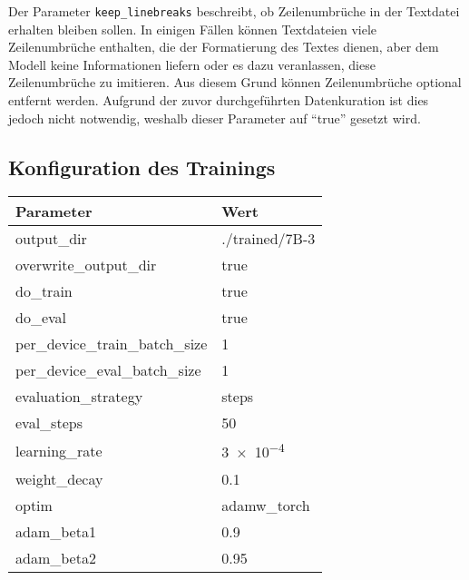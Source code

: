 Der Parameter \texttt{keep\_linebreaks} beschreibt, ob Zeilenumbrüche in der Textdatei erhalten bleiben sollen.
In einigen Fällen können Textdateien viele Zeilenumbrüche enthalten, die der Formatierung des Textes dienen, aber dem Modell keine Informationen liefern oder es dazu veranlassen, diese Zeilenumbrüche zu imitieren.
Aus diesem Grund können Zeilenumbrüche optional entfernt werden.
Aufgrund der zuvor durchgeführten Datenkuration ist dies jedoch nicht notwendig, weshalb dieser Parameter auf \enquote{true} gesetzt wird.\\

\subsection{Konfiguration des Trainings}\label{subsec:config-training}
\begin{table}
    \centering
    \begin{tabular}{ll}
        \toprule
        \textbf{Parameter}              & \textbf{Wert}                      \\
        \midrule
        output\_dir                     & ./trained/7B-3                     \\
        overwrite\_output\_dir          & true                               \\
        do\_train                       & true                               \\
        do\_eval                        & true                               \\
        per\_device\_train\_batch\_size & 1                                  \\
        per\_device\_eval\_batch\_size  & 1                                  \\
        evaluation\_strategy            & steps                              \\
        eval\_steps                     & 50                                 \\
        learning\_rate                  & \num{3e-4}                         \\
        weight\_decay                   & \SI{0.1}{}                         \\
        optim                           & adamw\_torch                       \\
        adam\_beta1                     & \SI{0.9}{}                         \\
        adam\_beta2                     & \SI{0.95}{}                        \\

\end{tabular}
\end{table}
